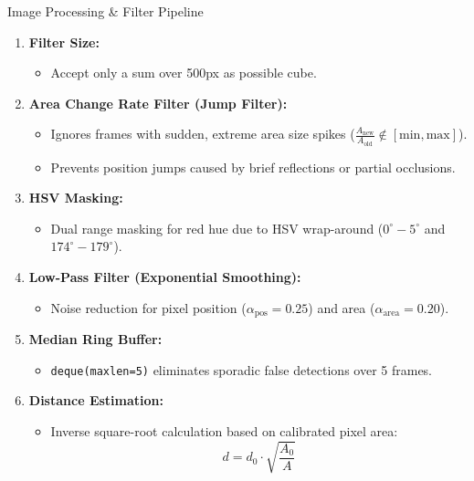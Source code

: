 \documentclass[aspectratio=169, 11pt]{beamer}
\begin{document}
\begin{frame}{Image Processing \& Filter Pipeline}
    \begin{enumerate}
        \item \textbf{Filter Size:}
            \begin{itemize}
                \item Accept only a sum over 500px as possible cube.
            \end{itemize}
        \item \textbf{Area Change Rate Filter (Jump Filter):}
            \begin{itemize}
                \item Ignores frames with sudden, extreme area size spikes ($\frac{A_{\text{new}}}{A_{\text{old}}} \notin [\text{min}, \text{max}]$).
                \item Prevents position jumps caused by brief reflections or partial occlusions.
            \end{itemize}
        \item \textbf{HSV Masking:}
            \begin{itemize}
                \item Dual range masking for red hue due to HSV wrap-around ($0^\circ{-}5^\circ$ and $174^\circ{-}179^\circ$).
            \end{itemize}
        \item \textbf{Low-Pass Filter (Exponential Smoothing):}
            \begin{itemize}
                \item Noise reduction for pixel position ($\alpha_{\text{pos}} = 0.25$) and area ($\alpha_{\text{area}} = 0.20$).
            \end{itemize}
        \item \textbf{Median Ring Buffer:}
            \begin{itemize}
                \item \texttt{deque(maxlen=5)} eliminates sporadic false detections over 5 frames.
            \end{itemize}
        \item \textbf{Distance Estimation:}
            \begin{itemize}
                \item Inverse square-root calculation based on calibrated pixel area:
                $$d = d_0 \cdot \sqrt{\frac{A_0}{A}}$$
            \end{itemize}
    \end{enumerate}
\end{frame}
\end{document}
